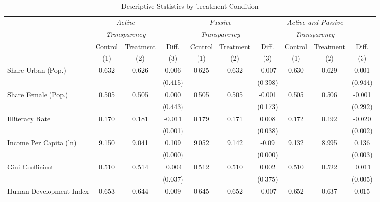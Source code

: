 \begin{table}[!htbp]
\centering
\caption{Descriptive Statistics by Treatment Condition}
\label{tab:descriptivestats3}
\scriptsize
\begin{tabular}{@{\extracolsep{-4pt}}l@{\extracolsep{-3pt}}ccccccccc}
\hline
\hline
& \multicolumn{2}{c}{\emph{Active}} & & \multicolumn{2}{c}{\emph{Passive}} & & \multicolumn{2}{c}{\emph{Active and Passive}} \T \\
& \multicolumn{2}{c}{\emph{Transparency}} & & \multicolumn{2}{c}{\emph{Transparency}} & & \multicolumn{2}{c}{\emph{Transparency}} \B \\
\cline{2-3} \cline{5-6} \cline{8-9}
& Control & Treatment & Diff. & Control & Treatment & Diff. & Control & Treatment & Diff. \T \B \\
& (1) & (2) & (3) & (1) & (2) & (3) & (1) & (2) & (3) \B \\
\hline
Share Urban (Pop.)                   & 0.632 & 0.626 & 0.006  & 0.625 & 0.632 & -0.007 &  0.630 & 0.629 & 0.001  \T \\
                                     &       &       & (0.415)&       &       & (0.398)&        &       & (0.944)   \\
Share Female (Pop.)                  & 0.505 & 0.505 & 0.000  & 0.505 & 0.505 & -0.001 &  0.505 & 0.506 & -0.001    \\
                                     &       &       & (0.443)&       &       & (0.173)&        &       & (0.292)   \\
Illiteracy Rate                      & 0.170 & 0.181 & -0.011 & 0.179 & 0.171 & 0.008  &  0.172 & 0.192 & -0.020    \\
                                     &       &       & (0.001)&       &       & (0.038)&        &       & (0.002)   \\
Income Per Capita (ln)               & 9.150 & 9.041 & 0.109  & 9.052 & 9.142 & -0.09  &  9.132 & 8.995 & 0.136     \\
                                     &       &       & (0.000)&       &       & (0.000)&        &       & (0.003)   \\
Gini Coefficient                     & 0.510 & 0.514 & -0.004 & 0.512 & 0.510 & 0.002  &  0.510 & 0.522 & -0.011    \\
                                     &       &       & (0.037)&       &       & (0.375)&        &       & (0.005)   \\
Human Development Index \vspace{1pt} & 0.653 & 0.644 & 0.009  & 0.645 & 0.652 & -0.007 &  0.652 & 0.637 & 0.015     \\

\end{tabular}
\end{table}
